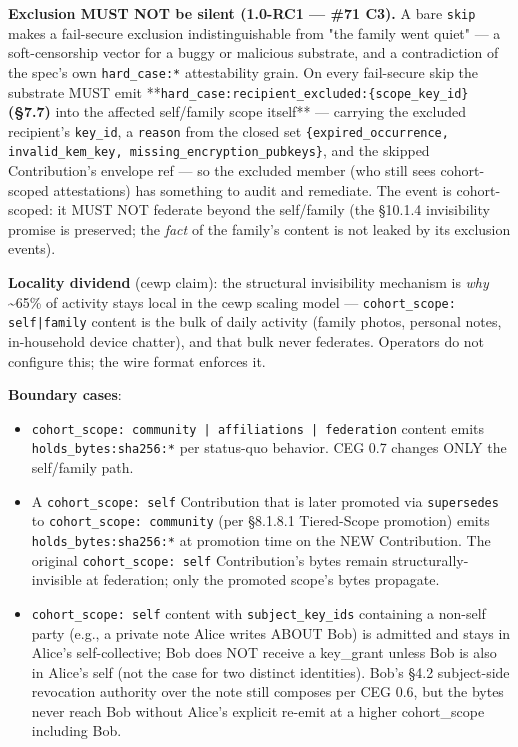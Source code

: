 \documentclass[11pt]{article}
\begin{document}
\textbf{Exclusion MUST NOT be silent (1.0-RC1 — \#71 C3).} A bare \texttt{skip} makes a fail-secure exclusion indistinguishable from "the family went quiet" — a soft-censorship vector for a buggy or malicious substrate, and a contradiction of the spec's own \texttt{hard\_case:*} attestability grain. On every fail-secure skip the substrate MUST emit **\texttt{hard\_case:recipient\_excluded:\{scope\_key\_id\}}\textbf{ (§7.7) }into the affected self/family scope itself** — carrying the excluded recipient's \texttt{key\_id}, a \texttt{reason} from the closed set \texttt{\{expired\_occurrence, invalid\_kem\_key, missing\_encryption\_pubkeys\}}, and the skipped Contribution's envelope ref — so the excluded member (who still sees cohort-scoped attestations) has something to audit and remediate. The event is cohort-scoped: it MUST NOT federate beyond the self/family (the §10.1.4 invisibility promise is preserved; the \textit{fact} of the family's content is not leaked by its exclusion events).


\textbf{Locality dividend} (cewp claim): the structural invisibility mechanism is \textit{why} \textasciitilde{}65\% of activity stays local in the cewp scaling model — \texttt{cohort\_scope: self|family} content is the bulk of daily activity (family photos, personal notes, in-household device chatter), and that bulk never federates. Operators do not configure this; the wire format enforces it.


\textbf{Boundary cases}:


\begin{itemize}\setlength\itemsep{0pt}
\item \texttt{cohort\_scope: community | affiliations | federation} content emits \texttt{holds\_bytes:sha256:*} per status-quo behavior. CEG 0.7 changes ONLY the self/family path.
\item A \texttt{cohort\_scope: self} Contribution that is later promoted via \texttt{supersedes} to \texttt{cohort\_scope: community} (per §8.1.8.1 Tiered-Scope promotion) emits \texttt{holds\_bytes:sha256:*} at promotion time on the NEW Contribution. The original \texttt{cohort\_scope: self} Contribution's bytes remain structurally-invisible at federation; only the promoted scope's bytes propagate.
\item \texttt{cohort\_scope: self} content with \texttt{subject\_key\_ids} containing a non-self party (e.g., a private note Alice writes ABOUT Bob) is admitted and stays in Alice's self-collective; Bob does NOT receive a key\_grant unless Bob is also in Alice's self (not the case for two distinct identities). Bob's §4.2 subject-side revocation authority over the note still composes per CEG 0.6, but the bytes never reach Bob without Alice's explicit re-emit at a higher cohort\_scope including Bob.
\end{itemize}
\end{document}
